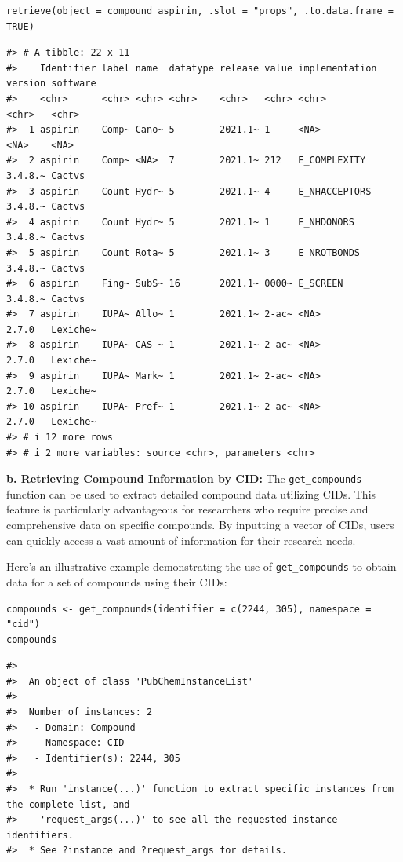 \begin{verbatim}
retrieve(object = compound_aspirin, .slot = "props", .to.data.frame = TRUE)
\end{verbatim}

\begin{verbatim}
#> # A tibble: 22 x 11
#>    Identifier label name  datatype release value implementation version software
#>    <chr>      <chr> <chr> <chr>    <chr>   <chr> <chr>          <chr>   <chr>   
#>  1 aspirin    Comp~ Cano~ 5        2021.1~ 1     <NA>           <NA>    <NA>    
#>  2 aspirin    Comp~ <NA>  7        2021.1~ 212   E_COMPLEXITY   3.4.8.~ Cactvs  
#>  3 aspirin    Count Hydr~ 5        2021.1~ 4     E_NHACCEPTORS  3.4.8.~ Cactvs  
#>  4 aspirin    Count Hydr~ 5        2021.1~ 1     E_NHDONORS     3.4.8.~ Cactvs  
#>  5 aspirin    Count Rota~ 5        2021.1~ 3     E_NROTBONDS    3.4.8.~ Cactvs  
#>  6 aspirin    Fing~ SubS~ 16       2021.1~ 0000~ E_SCREEN       3.4.8.~ Cactvs  
#>  7 aspirin    IUPA~ Allo~ 1        2021.1~ 2-ac~ <NA>           2.7.0   Lexiche~
#>  8 aspirin    IUPA~ CAS-~ 1        2021.1~ 2-ac~ <NA>           2.7.0   Lexiche~
#>  9 aspirin    IUPA~ Mark~ 1        2021.1~ 2-ac~ <NA>           2.7.0   Lexiche~
#> 10 aspirin    IUPA~ Pref~ 1        2021.1~ 2-ac~ <NA>           2.7.0   Lexiche~
#> # i 12 more rows
#> # i 2 more variables: source <chr>, parameters <chr>
\end{verbatim}

\textbf{b. Retrieving Compound Information by CID:} The \texttt{get\_compounds} function can be used to extract detailed compound data utilizing CIDs. This feature is particularly advantageous for researchers who require precise and comprehensive data on specific compounds. By inputting a vector of CIDs, users can quickly access a vast amount of information for their research needs.

Here's an illustrative example demonstrating the use of \texttt{get\_compounds} to obtain data for a set of compounds using their CIDs:

\begin{verbatim}
compounds <- get_compounds(identifier = c(2244, 305), namespace = "cid") 
compounds
\end{verbatim}

\begin{verbatim}
#> 
#>  An object of class 'PubChemInstanceList'
#> 
#>  Number of instances: 2
#>   - Domain: Compound
#>   - Namespace: CID
#>   - Identifier(s): 2244, 305
#> 
#>  * Run 'instance(...)' function to extract specific instances from the complete list, and
#>    'request_args(...)' to see all the requested instance identifiers.
#>  * See ?instance and ?request_args for details.
\end{verbatim}


